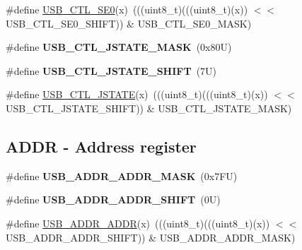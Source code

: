 \begin{DoxyCompactItemize}
\item 
\#define \mbox{\hyperlink{group___u_s_b___register___masks_ga438fbda9fa4299d7b9761ca3f63afa6d}{U\+S\+B\+\_\+\+C\+T\+L\+\_\+\+S\+E0}}(x)~(((uint8\+\_\+t)(((uint8\+\_\+t)(x)) $<$$<$ U\+S\+B\+\_\+\+C\+T\+L\+\_\+\+S\+E0\+\_\+\+S\+H\+I\+FT)) \& U\+S\+B\+\_\+\+C\+T\+L\+\_\+\+S\+E0\+\_\+\+M\+A\+SK)
\item 
\mbox{\label{group___u_s_b___register___masks_ga3a56395d81066c161d523479ed340907}} 
\#define {\bfseries U\+S\+B\+\_\+\+C\+T\+L\+\_\+\+J\+S\+T\+A\+T\+E\+\_\+\+M\+A\+SK}~(0x80\+U)
\item 
\mbox{\label{group___u_s_b___register___masks_gad553773ca9a02b344ab10269c999d143}} 
\#define {\bfseries U\+S\+B\+\_\+\+C\+T\+L\+\_\+\+J\+S\+T\+A\+T\+E\+\_\+\+S\+H\+I\+FT}~(7\+U)
\item 
\#define \mbox{\hyperlink{group___u_s_b___register___masks_ga61736e62d6fdc40d1b100eadc0ab2be2}{U\+S\+B\+\_\+\+C\+T\+L\+\_\+\+J\+S\+T\+A\+TE}}(x)~(((uint8\+\_\+t)(((uint8\+\_\+t)(x)) $<$$<$ U\+S\+B\+\_\+\+C\+T\+L\+\_\+\+J\+S\+T\+A\+T\+E\+\_\+\+S\+H\+I\+FT)) \& U\+S\+B\+\_\+\+C\+T\+L\+\_\+\+J\+S\+T\+A\+T\+E\+\_\+\+M\+A\+SK)
\end{DoxyCompactItemize}
\subsection*{A\+D\+DR -\/ Address register}
\begin{DoxyCompactItemize}
\item 
\mbox{\label{group___u_s_b___register___masks_ga7ccfd8bde2bb3831d13280315df4501c}} 
\#define {\bfseries U\+S\+B\+\_\+\+A\+D\+D\+R\+\_\+\+A\+D\+D\+R\+\_\+\+M\+A\+SK}~(0x7\+F\+U)
\item 
\mbox{\label{group___u_s_b___register___masks_ga57c7c394504da946dae75d5b20a2f297}} 
\#define {\bfseries U\+S\+B\+\_\+\+A\+D\+D\+R\+\_\+\+A\+D\+D\+R\+\_\+\+S\+H\+I\+FT}~(0\+U)
\item 
\#define \mbox{\hyperlink{group___u_s_b___register___masks_gad42e50014eedee91315521b19199ef39}{U\+S\+B\+\_\+\+A\+D\+D\+R\+\_\+\+A\+D\+DR}}(x)~(((uint8\+\_\+t)(((uint8\+\_\+t)(x)) $<$$<$ U\+S\+B\+\_\+\+A\+D\+D\+R\+\_\+\+A\+D\+D\+R\+\_\+\+S\+H\+I\+FT)) \& U\+S\+B\+\_\+\+A\+D\+D\+R\+\_\+\+A\+D\+D\+R\+\_\+\+M\+A\+SK)
\end{DoxyCompactItemize}

